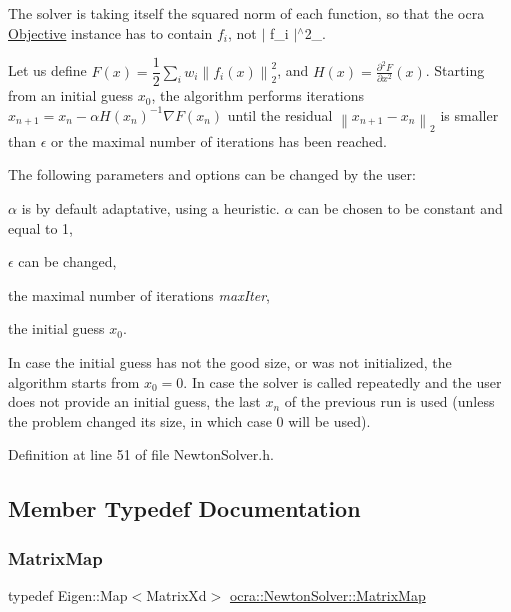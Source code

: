 The solver is taking itself the squared norm of each function, so that the ocra \hyperlink{classocra_1_1Objective}{Objective} instance has to contain $ f_i $, not $|$ f\+\_\+i $|$$^\wedge$2\+\_.

Let us define $ F(x) = \dfrac{1}{2} \sum_i{ w_i \left\| f_i(x) \right\|^2_2} $, and $ H(x)=\frac{\partial^2 F}{\partial x^2}(x)$. Starting from an initial guess $ x_0 $, the algorithm performs iterations $ x_{n+1} = x_n - \alpha H(x_n)^{-1} \nabla F(x_n) $ until the residual $ \left\|x_{n+1} - x_n\right\|_2$ is smaller than $ \epsilon $ or the maximal number of iterations has been reached.

The following parameters and options can be changed by the user\+:
\begin{DoxyItemize}
\item $ \alpha $ is by default adaptative, using a heuristic. $ \alpha $ can be chosen to be constant and equal to 1,
\item $ \epsilon $ can be changed,
\item the maximal number of iterations {\itshape max\+Iter},
\item the initial guess $ x_0 $.
\end{DoxyItemize}

In case the initial guess has not the good size, or was not initialized, the algorithm starts from $ x_0=0 $. In case the solver is called repeatedly and the user does not provide an initial guess, the last $ x_n $ of the previous run is used (unless the problem changed its size, in which case 0 will be used). 

Definition at line 51 of file Newton\+Solver.\+h.



\subsection{Member Typedef Documentation}
\hypertarget{classocra_1_1NewtonSolver_a53e3463c336170efa3819d725c9b16e3}{}\label{classocra_1_1NewtonSolver_a53e3463c336170efa3819d725c9b16e3} 
\subsubsection{\texorpdfstring{Matrix\+Map}{MatrixMap}}
{\footnotesize\ttfamily typedef Eigen\+::\+Map$<$Matrix\+Xd$>$ \hyperlink{classocra_1_1NewtonSolver_a53e3463c336170efa3819d725c9b16e3}{ocra\+::\+Newton\+Solver\+::\+Matrix\+Map}}



